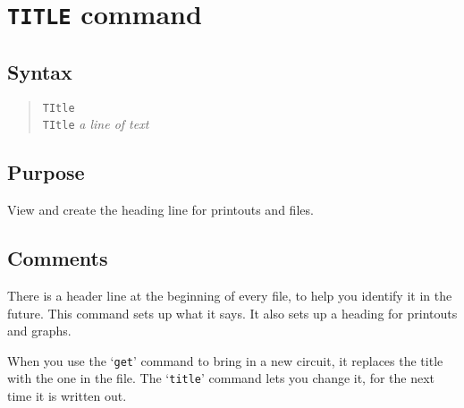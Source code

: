 %
%
%
%
\section{{\tt TITLE} command}
\subsection{Syntax}
\begin{verse}
{\tt TItle}\\
{\tt TItle} {\it a line of text}
\end{verse}
\subsection{Purpose}

View and create the heading line for printouts and files.
\subsection{Comments}

There is a header line at the beginning of every file, to help you identify
it in the future.  This command sets up what it says.  It also sets up a
heading for printouts and graphs.

When you use the `{\tt get}' command to bring in a new circuit, it replaces the
title with the one in the file.  The `{\tt title}' command lets you change it,
for the next time it is written out.

